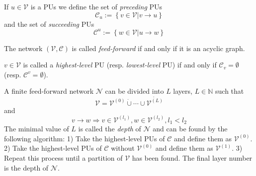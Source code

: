 \documentclass[a4paper,11pt]{article}
\begin{document}
\begin{Not}
If $u\in\mathcal{V}$ is a PUs we define the set of \emph{preceding} PUs
\begin{equation}
\mathcal{C}_u:=\left\{v\in\mathcal{V}|v\to u\right\}
\end{equation}
and the set of \emph{succeeding} PUs
\begin{equation}
\mathcal{C}^u:=\left\{w\in\mathcal{V}|u\to w\right\}
\end{equation}
\end{Not}
\begin{Def}
The network $(\mathcal{V},\mathcal{C})$ is called \emph{feed-forward} if and only if it is an acyclic graph.
\end{Def}
\begin{Def}
$v\in\mathcal{V}$ is called a \emph{highest-level} PU (resp. \emph{lowest-level} PU) if and only if $\mathcal{C}_v=\emptyset$ (resp. $\mathcal{C}^v=\emptyset$).
\end{Def}
\begin{Pro}\label{pro:layerstruct}
A finite feed-forward network $\mathcal{N}$ can be divided into $L$ layers, $L\in\mathbb{N}$ such that
\begin{equation}\label{eq:layers-v}
\mathcal{V}=\mathcal{V}^{(0)}\dot{\cup}\dotsb\cup\dot{\mathcal{V}^{(L)}}
\end{equation}
and
\begin{equation}\label{eq:layers}
v\to w\Rightarrow v\in\mathcal{V}^{(l_1)},w\in\mathcal{V}^{(l_2)}, l_1<l_2
\end{equation}
The minimal value of $L$ is called the \emph{depth} of $\mathcal{N}$ and can be found by the following algorithm: 1) Take the highest-level PUs of $\mathcal{C}$ and define them as $\mathcal{V}^{(0)}$. 2) Take the highest-level PUs of $\mathcal{C}$ without $\mathcal{V}^{(0)}$ and define them as $\mathcal{V}^{(1)}$. 3) Repeat this process until a partition of $\mathcal{V}$ has been found. The final layer number is the depth of $\mathcal{N}$.
\end{Pro}
\end{document}
